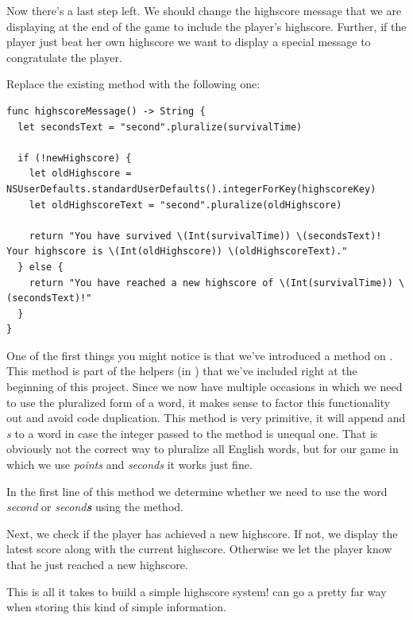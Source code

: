 Now there's a last step left. We should change the highscore message that we are
displaying at the end of the game to include the player's highscore. Further, if
the player just beat her own highscore we want to display a special message to
congratulate the player.

\begin{leftbar}
Replace the existing  method with the following
one:
\begin{lstlisting}
func highscoreMessage() -> String {
  let secondsText = "second".pluralize(survivalTime)

  if (!newHighscore) {
    let oldHighscore = NSUserDefaults.standardUserDefaults().integerForKey(highscoreKey)
    let oldHighscoreText = "second".pluralize(oldHighscore)
    
    return "You have survived \(Int(survivalTime)) \(secondsText)! Your highscore is \(Int(oldHighscore)) \(oldHighscoreText)."
  } else {
    return "You have reached a new highscore of \(Int(survivalTime)) \(secondsText)!"
  }
}
\end{lstlisting}
\end{leftbar}

One of the first things you might notice is that we've introduced a
 method on . This method is
part of the helpers (in ) that we've included right
at the beginning of this project. Since we now have multiple occasions in which
we need to use the pluralized form of a word, it makes sense to factor this
functionality out and avoid code duplication. This  method is very primitive, it will
append and \textit{s} to a word in case the integer passed to the method is
unequal one. That is obviously not the correct way to pluralize all English 
words, but for our game in which we use \textit{points} and \textit{seconds} it
works just fine.

In the first line of this method we determine whether we need to use the word
\textit{second} or \textit{second\textbf{s}} using the 
method.

Next, we check if the player has achieved a new highscore. If not, we display
the latest score along with the current highscore. Otherwise we let the player
know that he just reached a new highscore.

This is all it takes to build a simple highscore system!
 can go a pretty far way when storing this kind of
simple information.

